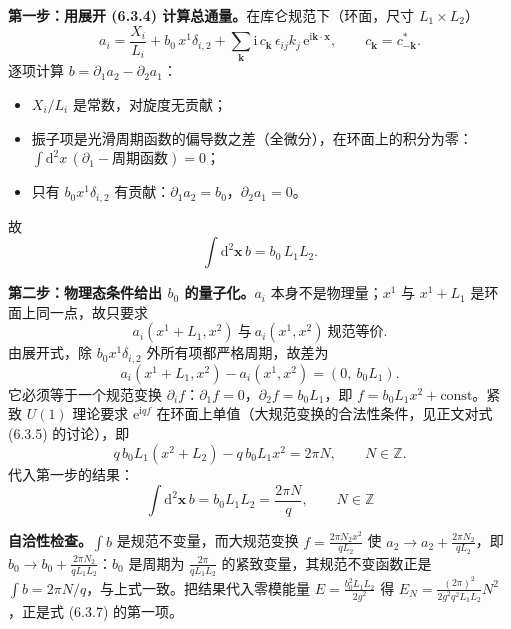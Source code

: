 \textbf{第一步：用展开 (6.3.4) 计算总通量。}在库仑规范下（环面，尺寸 $L_1\times L_2$）
\begin{equation*}
a_i=\frac{X_i}{L_i}+b_0\,x^1\delta_{i,2}+\sum_{\pmb k}\mathrm{i}\,c_{\pmb k}\,\epsilon_{ij}k_j\,\mathrm{e}^{\mathrm{i}\pmb k\cdot\pmb x},
\qquad c_{\pmb k}=c^*_{-\pmb k} .
\end{equation*}
逐项计算 $b=\partial_1a_2-\partial_2a_1$：
\begin{itemize}
\item $X_i/L_i$ 是常数，对旋度无贡献；
\item 振子项是光滑周期函数的偏导数之差（全微分），在环面上的积分为零：$\int\mathrm{d}^2x\,(\partial_1-\text{周期函数})=0$；
\item 只有 $b_0x^1\delta_{i,2}$ 有贡献：$\partial_1a_2=b_0$，$\partial_2a_1=0$。
\end{itemize}
故
\begin{equation*}
\int\mathrm{d}^2\pmb x\,b=b_0\,L_1L_2 .
\end{equation*}

\textbf{第二步：物理态条件给出 $b_0$ 的量子化。}$a_i$ 本身不是物理量；$x^1$ 与 $x^1+L_1$ 是环面上同一点，故只要求
\begin{equation*}
a_i(x^1+L_1,x^2)\ \text{与}\ a_i(x^1,x^2)\ \text{规范等价} .
\end{equation*}
由展开式，除 $b_0x^1\delta_{i,2}$ 外所有项都严格周期，故差为
\begin{equation*}
a_i(x^1+L_1,x^2)-a_i(x^1,x^2)=(0,\ b_0L_1) .
\end{equation*}
它必须等于一个规范变换 $\partial_i f$：$\partial_1f=0$，$\partial_2f=b_0L_1$，即 $f=b_0L_1x^2+\text{const}$。紧致 $U(1)$ 理论要求 $\mathrm{e}^{\mathrm{i}qf}$ 在环面上单值（大规范变换的合法性条件，见正文对式 (6.3.5) 的讨论），即
\begin{equation*}
q\,b_0L_1(x^2+L_2)-q\,b_0L_1x^2=2\pi N,
\qquad N\in\mathbb{Z} .
\end{equation*}
代入第一步的结果：
\begin{equation*}
\boxed{\ \int\mathrm{d}^2\pmb x\,b=b_0L_1L_2=\frac{2\pi N}{q},\qquad N\in\mathbb{Z}\ }
\end{equation*}

\textbf{自洽性检查。}$\int b$ 是规范不变量，而大规范变换 $f=\frac{2\pi N_2x^2}{qL_2}$ 使 $a_2\to a_2+\frac{2\pi N_2}{qL_2}$，即 $b_0\to b_0+\frac{2\pi N_2}{qL_1L_2}$：$b_0$ 是周期为 $\frac{2\pi}{qL_1L_2}$ 的紧致变量，其规范不变函数正是 $\int b=2\pi N/q$，与上式一致。把结果代入零模能量 $E=\frac{b_0^2L_1L_2}{2g^2}$ 得 $E_N=\frac{(2\pi)^2}{2g^2q^2L_1L_2}N^2$，正是式 (6.3.7) 的第一项。

